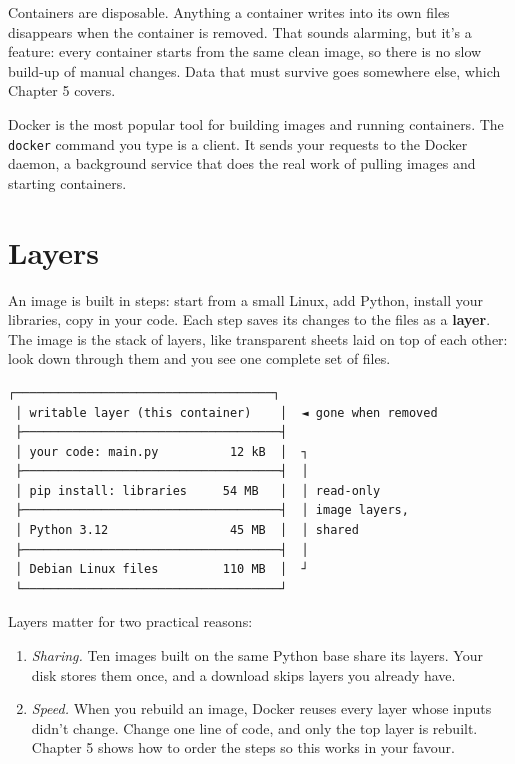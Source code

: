 Containers are disposable. Anything a container writes into its own files disappears when the container is removed. That sounds alarming, but it's a feature: every container starts from the same clean image, so there is no slow build-up of manual changes. Data that must survive goes somewhere else, which Chapter 5 covers.

Docker is the most popular tool for building images and running containers. The \texttt{docker} command you type is a client. It sends your requests to the Docker daemon, a background service that does the real work of pulling images and starting containers.

\section{Layers}\label{02-containers-shipping-the-whole-kitchen:layers}

An image is built in steps: start from a small Linux, add Python, install your libraries, copy in your code. Each step saves its changes to the files as a \textbf{layer}. The image is the stack of layers, like transparent sheets laid on top of each other: look down through them and you see one complete set of files.

\begin{codeblock}
\begin{Verbatim}[breaklines=false, fontsize=\fontsize{8.8}{8.68}\selectfont, fontfamily=diagrammono, formatcom=\diagramlines]
 ┌────────────────────────────────────┐
 │ writable layer (this container)    │  ◄ gone when removed
 ├────────────────────────────────────┤
 │ your code: main.py          12 kB  │  ┐
 ├────────────────────────────────────┤  │
 │ pip install: libraries     54 MB   │  │ read-only
 ├────────────────────────────────────┤  │ image layers,
 │ Python 3.12                 45 MB  │  │ shared
 ├────────────────────────────────────┤  │
 │ Debian Linux files         110 MB  │  ┘
 └────────────────────────────────────┘
\end{Verbatim}
\end{codeblock}

Layers matter for two practical reasons:

\begin{enumerate}
\def\labelenumi{\arabic{enumi}.}
\tightlist
\item
  \emph{Sharing.} Ten images built on the same Python base share its layers. Your disk stores them once, and a download skips layers you already have.
\item
  \emph{Speed.} When you rebuild an image, Docker reuses every layer whose inputs didn't change. Change one line of code, and only the top layer is rebuilt. Chapter 5 shows how to order the steps so this works in your favour.
\end{enumerate}

